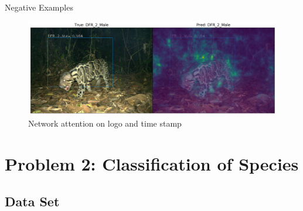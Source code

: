 \documentclass[10pt]{beamer}
\begin{document}

\begin{frame}{Negative Examples}
	\centering
	\begin{figure}
		\includegraphics[width=\columnwidth]{images/RetinaNet_No_Attention_correct2.png}
		\caption{Network attention on logo and time stamp}
	\end{figure}
\end{frame}

\section{Problem 2: Classification of Species}
\subsection{Data Set}
\end{document}
